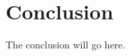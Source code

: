 \documentclass[conference]{IEEEtran}
\begin{document}
\section{Conclusion}
The conclusion will go here.













%
%
%




\end{document}
